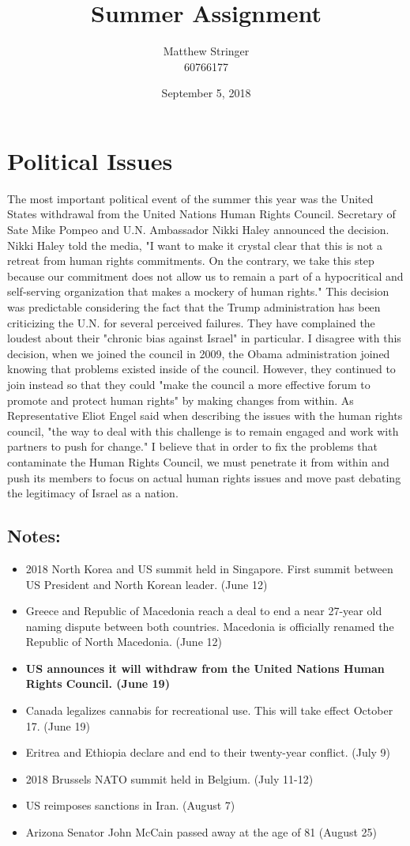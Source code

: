 \documentclass[12pt]{article} %
\title{Summer Assignment} %
\date{September 5, 2018}
\author{Matthew Stringer \\ 60766177} %
\begin{document}
\maketitle
\section{Political Issues}
The most important political event of the summer this year was the United States withdrawal from the United 
Nations Human Rights Council. Secretary of Sate Mike Pompeo and U.N. Ambassador Nikki Haley announced 
the decision. Nikki Haley told the media, "I want to make it crystal clear that this is not a retreat 
from human rights commitments. On the contrary, we take this step because our commitment does not
allow us to remain a part of a hypocritical and self-serving organization that makes a mockery of 
human rights." This decision was predictable considering the fact that the Trump administration
has been criticizing the U.N. for several perceived failures. They have complained the loudest about
their "chronic bias against Israel" in particular. 
I disagree with this decision, when we joined the council in 2009, the Obama administration joined
knowing that problems existed inside of the council. However, they continued to join instead so that
they could "make the council a more effective forum to promote and protect human rights" by making changes
from within. As Representative Eliot Engel said when describing the issues with the human rights council,
"the way to deal with this challenge is to remain engaged and work with partners to push for change." I 
believe that in order to fix the problems that contaminate the Human Rights Council, we must penetrate
it from within and push its members to focus on actual human rights issues and move past debating the
legitimacy of Israel as a nation. 
\subsection*{Notes:}
\begin{itemize}
	\item 2018 North Korea and US summit held in Singapore. First summit between US President and
	North Korean leader. (June 12)
	\item Greece and Republic of Macedonia reach a deal to end a near 27-year old naming dispute
	between both countries. Macedonia is officially renamed the Republic of North Macedonia. (June 12)
	\item \textbf{US announces it will withdraw from the United Nations Human Rights Council. (June 19)}
	\item Canada legalizes cannabis for recreational use. This will take effect October 17. (June 19)
	\item Eritrea and Ethiopia declare and end to their twenty-year conflict. (July 9)
	\item 2018 Brussels NATO summit held in Belgium. (July 11-12)
	\item US reimposes sanctions in Iran. (August 7)
	\item Arizona Senator John McCain passed away at the age of 81 (August 25)
\end{itemize}
\end{document}
